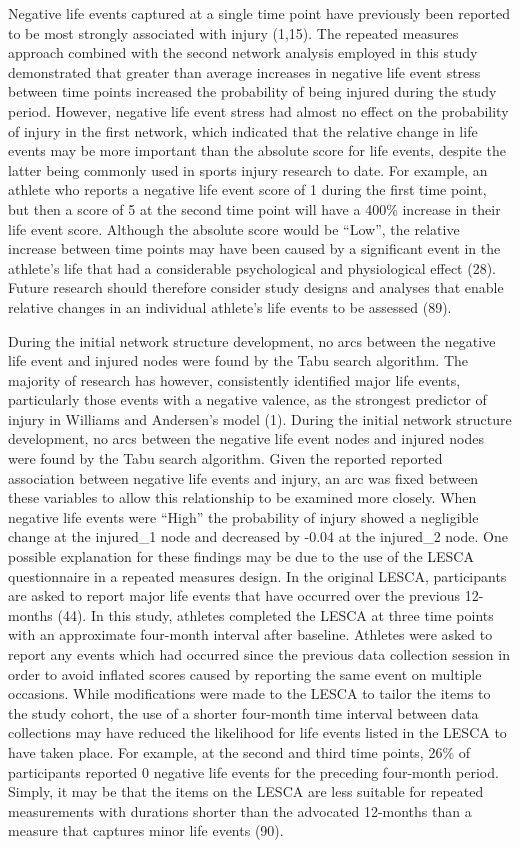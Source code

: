 \documentclass[
  english,
  man]{apa6}
\begin{document}
Negative life events captured at a single time point have previously been reported to be most strongly associated with injury (1,15).
The repeated measures approach combined with the second network analysis employed in this study demonstrated that greater than average increases in negative life event stress between time points increased the probability of being injured during the study period. However, negative life event stress had almost no effect on the probability of injury in the first network, which indicated that the relative change in life events may be more important than the absolute score for life events, despite the latter being commonly used in sports injury research to date.
For example, an athlete who reports a negative life event score of 1 during the first time point, but then a score of 5 at the second time point will have a 400\% increase in their life event score. Although the absolute score would be ``Low'', the relative increase between time points may have been caused by a significant event in the athlete's life that had a considerable psychological and physiological effect (28).
Future research should therefore consider study designs and analyses that enable relative changes in an individual athlete's life events to be assessed (89).

During the initial network structure development, no arcs between the negative life event and injured nodes were found by the Tabu search algorithm. The majority of research has however, consistently identified major life events, particularly those events with a negative valence, as the strongest predictor of injury in Williams and Andersen's model (1).
During the initial network structure development, no arcs between the negative life event nodes and injured nodes were found by the Tabu search algorithm.
Given the reported reported association between negative life events and injury, an arc was fixed between these variables to allow this relationship to be examined more closely.
When negative life events were ``High'' the probability of injury showed a negligible change at the injured\_1 node and decreased by -0.04 at the injured\_2 node.
One possible explanation for these findings may be due to the use of the LESCA questionnaire in a repeated measures design.
In the original LESCA, participants are asked to report major life events that have occurred over the previous 12-months (44).
In this study, athletes completed the LESCA at three time points with an approximate four-month interval after baseline. Athletes were asked to report any events which had occurred since the previous data collection session in order to avoid inflated scores caused by reporting the same event on multiple occasions.
While modifications were made to the LESCA to tailor the items to the study cohort, the use of a shorter four-month time interval between data collections may have reduced the likelihood for life events listed in the LESCA to have taken place. For example, at the second and third time points, 26\% of participants reported 0 negative life events for the preceding four-month period. Simply, it may be that the items on the LESCA are less suitable for repeated measurements with durations shorter than the advocated 12-months than a measure that captures minor life events (90).
\end{document}
